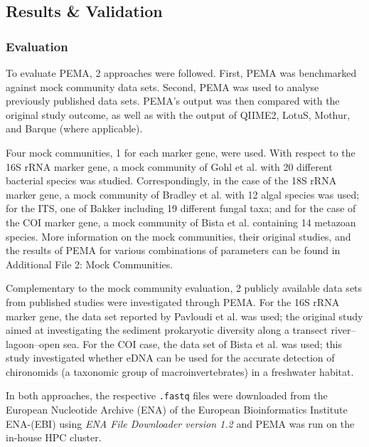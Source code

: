       
   \subsection{Results \& Validation}

   \subsubsection{Evaluation}

      To evaluate PEMA, 2 approaches were followed. 
      First, PEMA was benchmarked against mock community data sets. 
      Second, PEMA was used to analyse previously published data sets. 
      PEMA's output was then compared with the original study outcome, as well as with the output of QIIME2, LotuS, Mothur, and Barque (where applicable).

      Four mock communities, 1 for each marker gene, were used. With respect to the 16S rRNA marker gene, a mock community of Gohl et al. \citep{gohl2016systematic} with 20 different bacterial species was studied. 
      Correspondingly, in the case of the 18S rRNA marker gene, a mock community of Bradley et al. \citep{bradley2016} with 12 algal species was used; 
      for the ITS, one of Bakker \citep{bakker2018fungal} including 19 different fungal taxa; 
      and for the case of the COI marker gene, a mock community of Bista et al. \citep{bista2018performance} containing 14 metazoan species. 
      More information on the mock communities, their original studies, and the results of PEMA for various combinations of parameters can be found in Additional File 2: Mock Communities.

      Complementary to the mock community evaluation, 2 publicly available data sets from published studies were investigated through PEMA. 
      For the 16S rRNA marker gene, the data set reported by Pavloudi et al. \citep{pavloudi2017sediment} was used; 
      the original study aimed at investigating the sediment prokaryotic diversity along a transect river–lagoon–open sea. 
      For the COI case, the data set of Bista et al. \citep{bista2017annual} was used; 
      this study investigated whether eDNA can be used for the accurate detection of chironomids (a taxonomic group of macroinvertebrates) in a freshwater habitat.

      In both approaches, the respective \texttt{.fastq} files were downloaded from the European Nucleotide Archive (ENA) of the European Bioinformatics Institute ENA-(EBI) using \textit{ENA File Downloader version 1.2} \citep{harrison2019european} and PEMA was run on the in-house HPC cluster.

